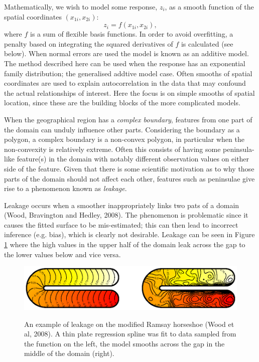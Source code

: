 \documentclass[useAMS,referee, usegraphicx]{biom}
\begin{document}
Mathematically, we wish to model some response, $z_i$, as a smooth function of the spatial coordinates $(x_{1i}, x_{2i})$:
\begin{equation*}
z_i = f(x_{1i}, x_{2i}),
\end{equation*}
where $f$ is a sum of flexible basis functions. In order to avoid overfitting, a penalty based on integrating the squared derivatives of $f$ is calculated (see below). When normal errors are used the model is known as an additive model. The method described here can be used when the response has an exponential family distribution; the generalised addtive model case. Often smooths of spatial coordinates are used to explain autocorrelation in the data that may confound the actual relationships of interest. Here the focus is on simple smooths of spatial location, since these are the building blocks of the more complicated models.

When the geographical region has a \emph{complex boundary}, features from one part of the domain can unduly influence other parts. Considering the boundary as a polygon, a complex boundary is a non-convex polygon, in particular when the non-convexity is relatively extreme. Often this consists of having some peninsula-like feature(s) in the domain with notably different observation values on either side of the feature. Given that there is some scientific motivation as to why those parts of the domain should not affect each other, features such as peninsulae give rise to a phenomenon known as \emph{leakage}.

Leakage occurs when a smoother inappropriately links two pats of a domain (Wood, Bravington and Hedley, 2008). The phenomenon is problematic since it causes the fitted surface to be mis-estimated; this can then lead to incorrect inference (e.g. bias), which is clearly not desirable. Leakage can be seen in Figure \ref{leakage} where the high values in the upper half of the domain leak across the gap to the lower values below and vice versa.

\begin{figure}
\centering
\includegraphics[width=\textwidth]{figs/ramsay-leak.ps}\\
\caption{An example of leakage on the modified Ramsay horseshoe (Wood et al, 2008). A thin plate regression spline was fit to data sampled from the function on the left, the model smooths across the gap in the middle of the domain (right).}
\label{leakage}
\end{figure}
\end{document}
